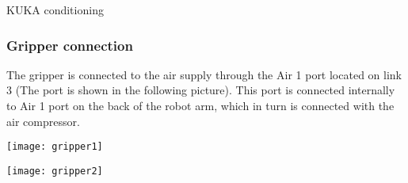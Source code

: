 \documentclass{book}
\begin{document}
\begin{chapter}{KUKA conditioning}
 		\subsubsection{Gripper connection}
 		The gripper is connected to the air supply through the Air 1 port located on link 3 (The port is shown in the following picture). This port is connected internally to Air 1 port on the back of the robot arm, which in turn is connected with the air compressor.
 		\newline
 			\begin{minipage}{0.5\textwidth}	
 			\texttt{[image: gripper1]}
 		\end{minipage} \hfill
 		\begin{minipage}{0.6\textwidth}
 			\texttt{[image: gripper2]}
 		\end{minipage}
 		


\end{chapter}
\end{document}

